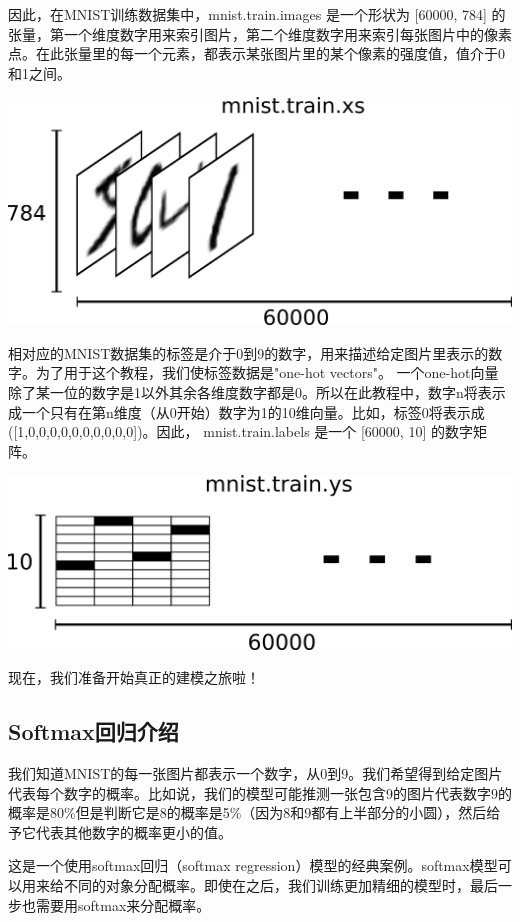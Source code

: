因此，在MNIST训练数据集中，mnist.train.images 是一个形状为 [60000, 784] 的张量，第一个维度数字用来索引图片，第二个维度数字用来索引每张图片中的像素点。在此张量里的每一个元素，都表示某张图片里的某个像素的强度值，值介于0和1之间。

\begin{center}
\includegraphics[width=.75\textwidth]{../SOURCE/images/mnist-train-xs.png}
\end{center}

相对应的MNIST数据集的标签是介于0到9的数字，用来描述给定图片里表示的数字。为了用于这个教程，我们使标签数据是"one-hot vectors"。 一个one-hot向量除了某一位的数字是1以外其余各维度数字都是0。所以在此教程中，数字n将表示成一个只有在第n维度（从0开始）数字为1的10维向量。比如，标签0将表示成([1,0,0,0,0,0,0,0,0,0,0])。因此， mnist.train.labels 是一个 [60000, 10] 的数字矩阵。

\begin{center}
\includegraphics[width=.75\textwidth]{../SOURCE/images/mnist-train-ys.png}
\end{center}

现在，我们准备开始真正的建模之旅啦！

\subsection {Softmax回归介绍}

我们知道MNIST的每一张图片都表示一个数字，从0到9。我们希望得到给定图片代表每个数字的概率。比如说，我们的模型可能推测一张包含9的图片代表数字9的概率是80\%但是判断它是8的概率是5\%（因为8和9都有上半部分的小圆），然后给予它代表其他数字的概率更小的值。

这是一个使用softmax回归（softmax regression）模型的经典案例。softmax模型可以用来给不同的对象分配概率。即使在之后，我们训练更加精细的模型时，最后一步也需要用softmax来分配概率。

